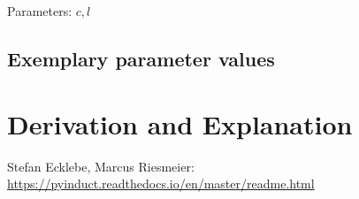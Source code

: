 \documentclass[10pt,a4paper]{article}
\begin{document}
	\noindent
	Parameters: $c, l$ %
	
	
	
	
	\subsection{Exemplary parameter values}
	

	
	\section{Derivation and Explanation} %



	
	
	\begin{thebibliography}{10}		
		Stefan Ecklebe, Marcus Riesmeier: \\
		\href{https://pyinduct.readthedocs.io/en/master/readme.html}{https://pyinduct.readthedocs.io/en/master/readme.html}
	\end{thebibliography}
\end{document}
